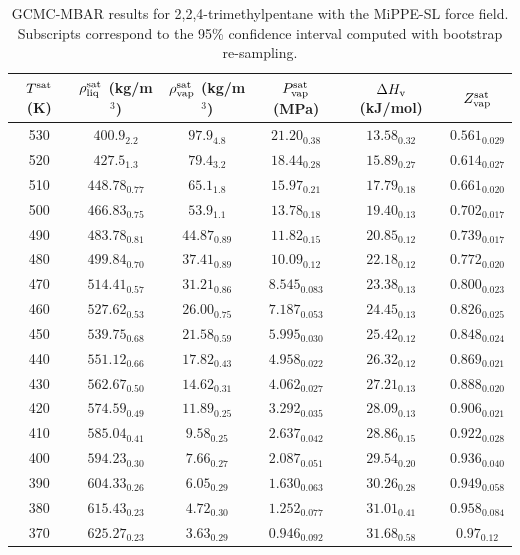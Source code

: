 \documentclass[journal=jctc,manuscript=article]{achemso}
\begin{document}
\begin{table}[htb!]
	\caption{GCMC-MBAR results for 2,2,4-trimethylpentane with the MiPPE-SL force field. Subscripts correspond to the 95\% confidence interval computed with bootstrap re-sampling.}
	\begin{center}
		\begin{tabular}{|c|c|c|c|c|c|}
			\hline
			$T^{\rm sat}$ (K) & $\rho_{\rm liq}^{\rm sat}$ (kg/m$^3$) & $\rho_{\rm vap}^{\rm sat}$ (kg/m$^3$) & $P_{\rm vap}^{\rm sat}$ (MPa) & $\Delta H_{\rm v}$ (kJ/mol) & $Z_{\rm vap}^{\rm sat}$ \\ \hline
			530 & $400.9_{2.2}$ & $97.9_{4.8}$ & $21.20_{0.38}$ & $13.58_{0.32}$ & $0.561_{0.029}$ \\
			520 & $427.5_{1.3}$ & $79.4_{3.2}$ & $18.44_{0.28}$ & $15.89_{0.27}$ & $0.614_{0.027}$ \\
			510 & $448.78_{0.77}$ & $65.1_{1.8}$ & $15.97_{0.21}$ & $17.79_{0.18}$ & $0.661_{0.020}$ \\
			500 & $466.83_{0.75}$ & $53.9_{1.1}$ & $13.78_{0.18}$ & $19.40_{0.13}$ & $0.702_{0.017}$ \\
			490 & $483.78_{0.81}$ & $44.87_{0.89}$ & $11.82_{0.15}$ & $20.85_{0.12}$ & $0.739_{0.017}$ \\
			480 & $499.84_{0.70}$ & $37.41_{0.89}$ & $10.09_{0.12}$ & $22.18_{0.12}$ & $0.772_{0.020}$ \\
			470 & $514.41_{0.57}$ & $31.21_{0.86}$ & $8.545_{0.083}$ & $23.38_{0.13}$ & $0.800_{0.023}$ \\
			460 & $527.62_{0.53}$ & $26.00_{0.75}$ & $7.187_{0.053}$ & $24.45_{0.13}$ & $0.826_{0.025}$ \\
			450 & $539.75_{0.68}$ & $21.58_{0.59}$ & $5.995_{0.030}$ & $25.42_{0.12}$ & $0.848_{0.024}$ \\
			440 & $551.12_{0.66}$ & $17.82_{0.43}$ & $4.958_{0.022}$ & $26.32_{0.12}$ & $0.869_{0.021}$ \\
			430 & $562.67_{0.50}$ & $14.62_{0.31}$ & $4.062_{0.027}$ & $27.21_{0.13}$ & $0.888_{0.020}$ \\
			420 & $574.59_{0.49}$ & $11.89_{0.25}$ & $3.292_{0.035}$ & $28.09_{0.13}$ & $0.906_{0.021}$ \\
			410 & $585.04_{0.41}$ & $9.58_{0.25}$ & $2.637_{0.042}$ & $28.86_{0.15}$ & $0.922_{0.028}$ \\
			400 & $594.23_{0.30}$ & $7.66_{0.27}$ & $2.087_{0.051}$ & $29.54_{0.20}$ & $0.936_{0.040}$ \\
			390 & $604.33_{0.26}$ & $6.05_{0.29}$ & $1.630_{0.063}$ & $30.26_{0.28}$ & $0.949_{0.058}$ \\
			380 & $615.43_{0.23}$ & $4.72_{0.30}$ & $1.252_{0.077}$ & $31.01_{0.41}$ & $0.958_{0.084}$ \\
			370 & $625.27_{0.23}$ & $3.63_{0.29}$ & $0.946_{0.092}$ & $31.68_{0.58}$ & $0.97_{0.12}$ \\
			\hline
		\end{tabular}
	\end{center}
\end{table}
\end{document}
